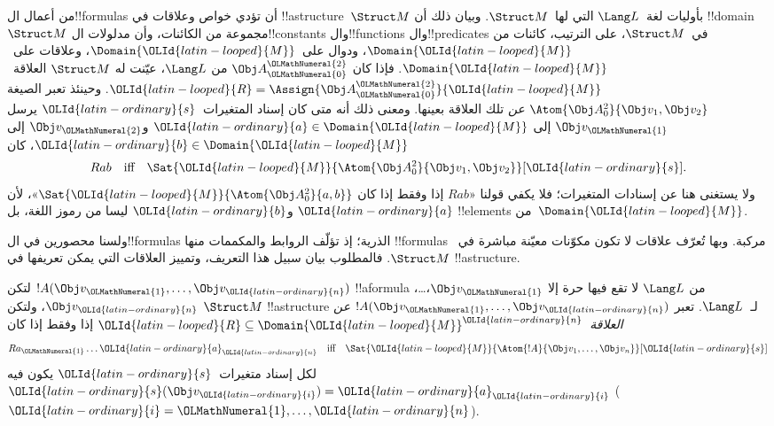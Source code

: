 \documentclass[../../../include/open-logic-section]{subfiles}
\begin{document}


\begin{explain}
من أعمال ال!!{formula}s أن تؤدي خواص وعلاقات في
!!a{structure}~$\Struct M$ بأوليات لغة~$\Lang L$
التي لها~$\Struct M$. وبيان ذلك أن !!{domain}~$\Struct M$
مجموعة من الكائنات، وأن مدلولات ال!!{constant}s وال!!{function}s
وال!!{predicate}s في~$\Struct M$، على الترتيب، كائنات من
$\Domain {\OLId{latin-looped}{M}}$، ودوال على~$\Domain {\OLId{latin-looped}{M}}$، وعلاقات على~$\Domain {\OLId{latin-looped}{M}}$.
فإذا كان $\Obj A^{\OLMathNumeral{2}}_{\OLMathNumeral{0}}$ من $\Lang L$، عيّنت له
$\Struct M$ العلاقة~${\OLId{latin-looped}{R}} = \Assign{{\Obj
  A^{\OLMathNumeral{2}}_{\OLMathNumeral{0}}}}{{\OLId{latin-looped}{M}}}$. وحينئذ تعبر الصيغة $\Atom{\Obj A^2_0}{\Obj v_1, \Obj v_2}$
\emph{عن} تلك العلاقة بعينها. ومعنى ذلك أنه متى كان إسناد
المتغيرات~${\OLId{latin-ordinary}{s}}$ يرسل $\Obj v_{\OLMathNumeral{1}}$ إلى ${\OLId{latin-ordinary}{a}} \in \Domain{{\OLId{latin-looped}{M}}}$ و$\Obj v_{\OLMathNumeral{2}}$
إلى ${\OLId{latin-ordinary}{b}} \in \Domain {\OLId{latin-looped}{M}}$، كان
\[
Rab \text{\quad iff\quad} \Sat{{\OLId{latin-looped}{M}}}{\Atom{\Obj A^2_0}{\Obj v_1, \Obj v_2}}[{\OLId{latin-ordinary}{s}}].
\]
ولا يستغنى هنا عن إسنادات المتغيرات؛ فلا يكفي قولنا
«$Rab$ إذا وفقط إذا كان $\Sat{{\OLId{latin-looped}{M}}}{\Atom{\Obj A^2_0}{a, b}}$»،
لأن ${\OLId{latin-ordinary}{a}}$ و${\OLId{latin-ordinary}{b}}$ ليسا من رموز اللغة، بل !!{element}s
من~$\Domain{{\OLId{latin-looped}{M}}}$.

ولسنا محصورين في ال!!{formula}s الذرية؛ إذ تؤلّف الروابط
والمكممات منها !!{formula}s مركبة. وبها تُعرّف علاقات لا تكون
مكوّنات معيّنة مباشرة في~$\Struct M$. فالمطلوب بيان سبيل
هذا التعريف، وتمييز العلاقات التي يمكن تعريفها في !!a{structure}.
\end{explain}

\begin{defn}
لتكن $!A(\Obj v_{\OLMathNumeral{1}},\dots, \Obj v_{\OLId{latin-ordinary}{n}})$ !!a{formula} من $\Lang L$ لا
تقع فيها حرة إلا $\Obj v_{\OLMathNumeral{1}}$،\dots، $\Obj v_{\OLId{latin-ordinary}{n}}$، ولتكن $\Struct M$
!!a{structure} لـ~$\Lang L$. تعبر $!A(\Obj v_{\OLMathNumeral{1}},\dots, \Obj v_{\OLId{latin-ordinary}{n}})$
\emph{عن العلاقة}~${\OLId{latin-looped}{R}} \subseteq \Domain {\OLId{latin-looped}{M}}^{\OLId{latin-ordinary}{n}}$ إذا وفقط إذا كان
\[
Ra_{\OLMathNumeral{1}}\dots {\OLId{latin-ordinary}{a}}_{\OLId{latin-ordinary}{n}} \text{\quad iff\quad} \Sat{{\OLId{latin-looped}{M}}}{\Atom{!A}{\Obj
    v_1,\dots, \Obj v_n}}[{\OLId{latin-ordinary}{s}}]
\]
لكل إسناد متغيرات~${\OLId{latin-ordinary}{s}}$ يكون فيه ${\OLId{latin-ordinary}{s}}(\Obj v_{\OLId{latin-ordinary}{i}}) = {\OLId{latin-ordinary}{a}}_{\OLId{latin-ordinary}{i}}$ (${\OLId{latin-ordinary}{i}} = {\OLMathNumeral{1}},
\dots, {\OLId{latin-ordinary}{n}}$).
\end{defn}
\end{document}
